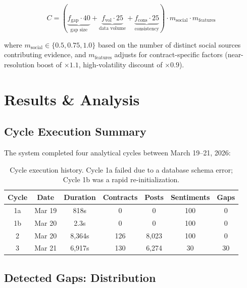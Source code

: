 \documentclass[12pt, letterpaper]{article}
\begin{document}
\begin{equation}
    C = \left(\underbrace{f_{\text{gap}} \cdot 40}_{\text{gap size}} + \underbrace{f_{\text{vol}} \cdot 25}_{\text{data volume}} + \underbrace{f_{\text{cons}} \cdot 25}_{\text{consistency}}\right) \cdot m_{\text{social}} \cdot m_{\text{features}}
\end{equation}

where $m_{\text{social}} \in \{0.5, 0.75, 1.0\}$ based on the number of distinct social sources contributing evidence, and $m_{\text{features}}$ adjusts for contract-specific factors (near-resolution boost of $\times 1.1$, high-volatility discount of $\times 0.9$).

\section{Results \& Analysis}
\label{sec:results}

\subsection{Cycle Execution Summary}

The system completed four analytical cycles between March 19--21, 2026:

\begin{table}[H]
\centering
\caption{Cycle execution history. Cycle 1a failed due to a database schema error; Cycle 1b was a rapid re-initialization.}
\label{tab:cycles}
\begin{tabular}{@{}ccccccc@{}}
\toprule
\textbf{Cycle} & \textbf{Date} & \textbf{Duration} & \textbf{Contracts} & \textbf{Posts} & \textbf{Sentiments} & \textbf{Gaps} \\
\midrule
1a & Mar 19 & 818s & 0 & 0 & 100 & 0 \\
1b & Mar 20 & 2.3s & 0 & 0 & 100 & 0 \\
2 & Mar 20 & 8,364s & 126 & 8,023 & 100 & 0 \\
3 & Mar 21 & 6,917s & 130 & 6,274 & 30 & 30 \\
\bottomrule
\end{tabular}
\end{table}

\subsection{Detected Gaps: Distribution}
\end{document}
